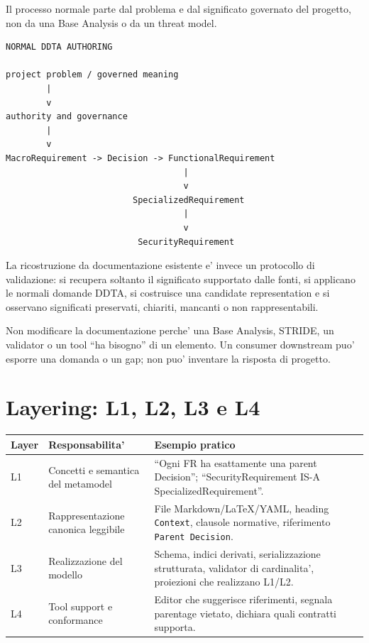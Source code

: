 \documentclass[11pt,a4paper]{article}
\begin{document}
\closedtag\quad Il processo normale parte dal problema e dal significato governato del progetto, non da una Base Analysis o da un threat model.

\begin{lstlisting}
NORMAL DDTA AUTHORING

project problem / governed meaning
        |
        v
authority and governance
        |
        v
MacroRequirement -> Decision -> FunctionalRequirement
                                   |
                                   v
                         SpecializedRequirement
                                   |
                                   v
                          SecurityRequirement
\end{lstlisting}

\holdouttag\quad La ricostruzione da documentazione esistente e' invece un protocollo di validazione: si recupera soltanto il significato supportato dalle fonti, si applicano le normali domande DDTA, si costruisce una candidate representation e si osservano significati preservati, chiariti, mancanti o non rappresentabili.

\begin{ddtaanti}[title={Authority inversion}]
Non modificare la documentazione perche' una Base Analysis, STRIDE, un validator o un tool ``ha bisogno'' di un elemento. Un consumer downstream puo' esporre una domanda o un gap; non puo' inventare la risposta di progetto.
\end{ddtaanti}

\section{Layering: L1, L2, L3 e L4}

\closedtag

\begin{tabularx}{\textwidth}{L{14mm}L{43mm}Y}
\toprule
\textbf{Layer} & \textbf{Responsabilita'} & \textbf{Esempio pratico} \\
\midrule
L1 & Concetti e semantica del metamodel & ``Ogni FR ha esattamente una parent Decision''; ``SecurityRequirement IS-A SpecializedRequirement''. \\
L2 & Rappresentazione canonica leggibile & File Markdown/LaTeX/YAML, heading \texttt{Context}, clausole normative, riferimento \texttt{Parent Decision}. \\
L3 & Realizzazione del modello & Schema, indici derivati, serializzazione strutturata, validator di cardinalita', proiezioni che realizzano L1/L2. \\
L4 & Tool support e conformance & Editor che suggerisce riferimenti, segnala parentage vietato, dichiara quali contratti supporta. \\
\bottomrule
\end{tabularx}
\end{document}

